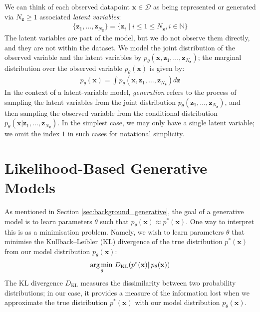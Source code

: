 \documentclass[ oneside,%
                    author={George Herbert},
                    degree={MSci},
                     title={Video Diffusion Models for Climate Simulations},
                  subtitle={}]{dissertation}
\begin{document}
We can think of each observed datapoint $\mathbf{x}\in\mathcal{D}$ as being represented or generated via $N_{\mathbf{z}}\ge 1$ associated \textit{latent variables}:
\begin{align}
      \{\mathbf{z}_1,\ldots,\mathbf{z}_{N_\mathbf{z}}\} = \{\mathbf{z}_i \mid i \le 1 \le N_{\mathbf{z}}, i \in \mathbb{N} \}
\end{align}
The latent variables are part of the model, but we do not observe them directly, and they are not within the dataset. We model the joint distribution of the observed variable and the latent variables by $p_\theta(\mathbf{x},\mathbf{z}_1,\ldots,\mathbf{z}_{N_\mathbf{z}})$; the marginal distribution over the observed variable $p_\theta(\mathbf{x})$ is given by:
\begin{align}
      p_\theta(\mathbf{x})=\int p_\theta(\mathbf{x},\mathbf{z}_1,\ldots,\mathbf{z}_{N_\mathbf{z}}) d\mathbf{z}
\end{align}
In the context of a latent-variable model, \textit{generation} refers to the process of sampling the latent variables from the joint distribution $p_\theta(\mathbf{z}_1,\ldots,\mathbf{z}_{N_\mathbf{z}})$, and then sampling the observed variable from the conditional distribution $p_\theta(\mathbf{x}|\mathbf{z}_1,\ldots,\mathbf{z}_{N_\mathbf{z}})$. In the simplest case, we may only have a single latent variable; we omit the index $1$ in such cases for notational simplicity.

\section{Likelihood-Based Generative Models}
\label{sec:background_unbiased_objective}

As mentioned in Section \ref{sec:background_generative}, the goal of a generative model is to learn parameters $\theta$ such that $p_\theta(\mathbf{x})\approx p^*(\mathbf{x})$. One way to interpret this is as a minimisation problem. Namely, we wish to learn parameters $\theta$ that minimise the Kullback--Leibler (KL) divergence of the true distribution $p^*(\mathbf{x})$ from our model distribution $p_\theta(\mathbf{x})$:
\begin{align}
      \operatorname*{arg\,min\,}_\theta D_{\mathrm{KL}}(p^*(\mathbf{x})\Vert p_\theta(\mathbf{x}))
\end{align}
The KL divergence $D_{\mathrm{KL}}$ measures the dissimilarity between two probability distributions; in our case, it provides a measure of the information lost when we approximate the true distribution $p^*(\mathbf{x})$ with our model distribution $p_\theta(\mathbf{x})$.
\end{document}
